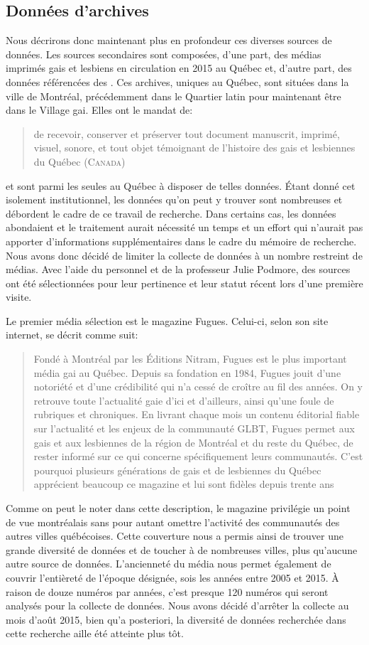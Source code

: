 \subsection{Données d'archives}
\label{sub:donn_es_d_archives}
Nous décrirons donc maintenant plus en profondeur ces diverses sources de données. 
Les sources secondaires sont composées, d'une part, des médias imprimés gais et lesbiens en circulation en 2015 au Québec et, d'autre part, des données référencées des \agq{}. 
Ces archives, uniques au Québec, sont situées dans la ville de Montréal, précédemment dans le Quartier latin pour maintenant être dans le Village gai.
Elles ont le mandat de: \blockquote[{\cite{LAGQ2014}}][.]{\textelp{} de recevoir,   conserver et préserver tout document manuscrit, imprimé, visuel, sonore, et   tout objet témoignant de l'histoire des gais et lesbiennes du Québec   (\textsc{Canada})} et sont parmi les seules au Québec à disposer de telles données. 
Étant donné cet isolement institutionnel, les données qu'on peut y trouver sont nombreuses et débordent le cadre de ce travail de recherche. 
Dans certains cas, les données abondaient et le traitement aurait nécessité un temps et un effort qui n'aurait pas apporter d'informations supplémentaires dans le cadre du mémoire de recherche. 
Nous avons donc décidé de limiter la collecte de données à un nombre restreint de médias. 
Avec l'aide du personnel et de la professeur Julie Podmore, des sources ont été sélectionnées pour leur pertinence et leur statut récent lors d'une première visite.

Le premier média sélection est le magazine Fugues. 
Celui-ci, selon son site internet, se décrit comme suit: \blockquote[{\cite{LesNitram2015}}][.]{
  Fondé à Montréal par les Éditions Nitram, Fugues est le plus important média gai au Québec. 
Depuis sa fondation en 1984, Fugues jouit d’une notoriété et d’une crédibilité qui n’a cessé de croître au fil des années. 
On y retrouve toute l’actualité gaie d’ici et d’ailleurs, ainsi qu'une foule de rubriques et chroniques. 
En livrant chaque mois un contenu éditorial fiable sur l’actualité et les enjeux de la communauté GLBT, Fugues permet aux gais et aux lesbiennes de la région de Montréal et du reste du Québec, de rester informé sur ce qui concerne spécifiquement leurs communautés. 
C’est pourquoi plusieurs générations de gais et de lesbiennes du Québec apprécient beaucoup ce magazine et lui sont fidèles depuis trente ans} 
Comme on peut le noter dans cette description, le magazine privilégie un point de vue montréalais sans pour autant omettre l'activité des communautés \lgbt{} des autres  villes québécoises. 
Cette couverture nous a permis ainsi de trouver une grande diversité de données et de toucher à de nombreuses villes, plus qu'aucune autre source de données. 
L'ancienneté du média nous permet également de couvrir l'entièreté de l'époque désignée, sois les années entre 2005 et 2015. 
À raison de douze numéros par années, c'est presque 120 numéros qui seront analysés pour la collecte de données. 
Nous avons décidé d'arrêter la collecte au mois d'août 2015, bien qu'a posteriori, la diversité de données recherchée dans cette recherche aille été atteinte plus tôt.

